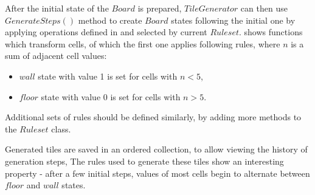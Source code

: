 \documentclass[12pt]{report}
\begin{document}
After the initial state of the $Board$ is prepared, $TileGenerator$ can then use $GenerateSteps()$ method to create $Board$ states following the initial one by applying operations defined in and selected by current $Ruleset$.  shows functions which transform cells, of which the first one applies following rules, where $n$ is a sum of adjacent cell values:

\begin{itemize}
	\item $wall$ state with value 1 is set for cells with $n < 5$,
	\item $floor$ state with value 0 is set for cells with $n > 5$.
\end{itemize}

Additional sets of rules should be defined similarly, by adding more methods to the $Ruleset$ class. 

Generated tiles are saved in an ordered collection, to allow viewing the history of generation steps, The rules used to generate these tiles show an interesting property - after a few initial steps, values of most cells begin to alternate between $floor$ and $wall$ states.
\end{document}
